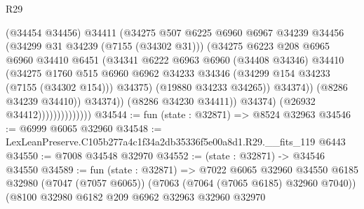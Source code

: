 \begin{lexlean}{R29}
\begin{coremodule}
                                        (@34454 @34456)
                                        @34411
                                        (@34275
                                          @507
                                          @6225
                                          @6960
                                          @6967
                                          @34239
                                          @34456
                                          (@34299 @31 @34239 (@7155 (@34302 @31)))
                                          (@34275
                                            @6223
                                            @208
                                            @6965
                                            @6960
                                            @34410
                                            @6451
                                            (@34341
                                              @6222
                                              @6963
                                              @6960
                                              (@34408 @34346)
                                              @34410
                                              (@34275
                                                @1760
                                                @515
                                                @6960
                                                @6962
                                                @34233
                                                @34346
                                                (@34299 @154 @34233 (@7155 (@34302 @154)))
                                                @34375)
                                              (@19880 @34233 @34265))
                                            @34374))
                                        (@8286 @34239 @34410))
                                      @34374))
                                  (@8286 @34230 @34411))
                                @34374)
                              (@26932 @34412))))))))))))))
@34544 := fun (state : @32871) => @8524 @32963
@34546 := @6999 @6065 @32960
@34548 := LexLeanPreserve.C105b277a4c1f34a2db35336f5e00a8d1.R29.__fits_119 @6443
@34550 := @7008 @34548 @32970
@34552 := (state : @32871) -> @34546 @34550
@34589 := fun (state : @32871) =>
  @7022
    @6065
    @32960
    @34550
    @6185
    @32980
    (@7047 (@7057 @6065))
    (@7063 (@7064 (@7065 @6185) @32960 @7040))
    (@8100
      @32980
      @6182
      @209
      @6962
      @32963
      @32960
      @32970

\end{coremodule}
\end{lexlean}
